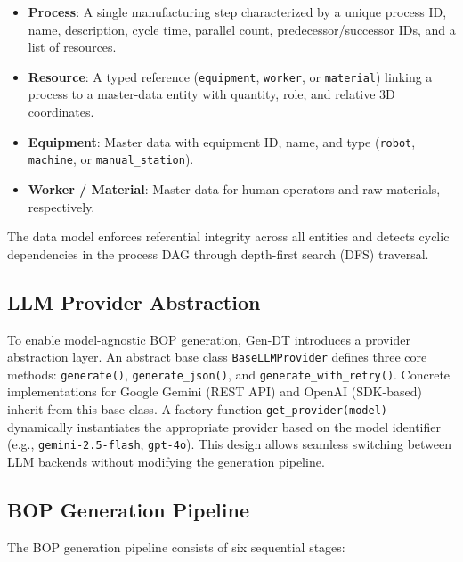 \begin{itemize}
    \item \textbf{Process}: A single manufacturing step characterized by a unique process ID, name, description, cycle time, parallel count, predecessor/successor IDs, and a list of resources.
    \item \textbf{Resource}: A typed reference (\texttt{equipment}, \texttt{worker}, or \texttt{material}) linking a process to a master-data entity with quantity, role, and relative 3D coordinates.
    \item \textbf{Equipment}: Master data with equipment ID, name, and type (\texttt{robot}, \texttt{machine}, or \texttt{manual\_station}).
    \item \textbf{Worker / Material}: Master data for human operators and raw materials, respectively.
\end{itemize}

The data model enforces referential integrity across all entities and detects cyclic dependencies in the process DAG through depth-first search (DFS) traversal.

\subsection{LLM Provider Abstraction}

To enable model-agnostic BOP generation, Gen-DT introduces a provider abstraction layer.
An abstract base class \texttt{BaseLLMProvider} defines three core methods: \texttt{generate()}, \texttt{generate\_json()}, and \texttt{generate\_with\_retry()}.
Concrete implementations for Google Gemini (REST API) and OpenAI (SDK-based) inherit from this base class.
A factory function \texttt{get\_provider(model)} dynamically instantiates the appropriate provider based on the model identifier (e.g., \texttt{gemini-2.5-flash}, \texttt{gpt-4o}).
This design allows seamless switching between LLM backends without modifying the generation pipeline.

\subsection{BOP Generation Pipeline}
\label{subsec:pipeline}

The BOP generation pipeline consists of six sequential stages:

